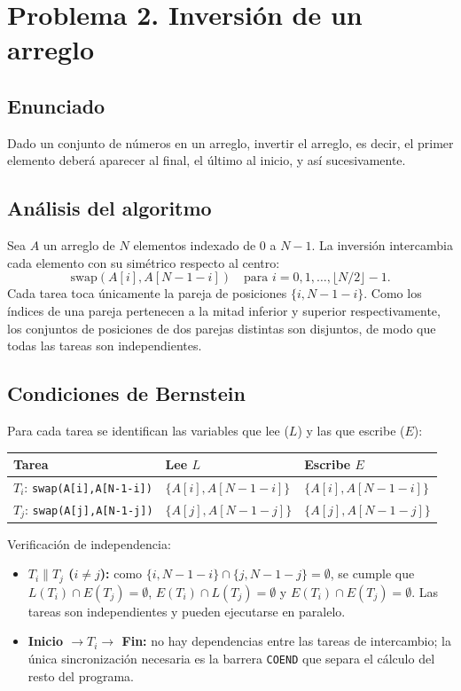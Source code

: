 \section{Problema 2. Inversi\'on de un arreglo}

\subsection*{Enunciado}
Dado un conjunto de n\'umeros en un arreglo, invertir el arreglo, es decir, el
primer elemento deber\'a aparecer al final, el \'ultimo al inicio, y as\'i
sucesivamente.

\subsection*{An\'alisis del algoritmo}
Sea $A$ un arreglo de $N$ elementos indexado de $0$ a $N-1$. La inversi\'on
intercambia cada elemento con su sim\'etrico respecto al centro:
\[
    \text{swap}(A[i], A[N-1-i]) \quad \text{para } i = 0, 1, \dots, \lfloor N/2 \rfloor - 1.
\]
Cada tarea toca \'unicamente la pareja de posiciones $\{i, N-1-i\}$. Como los
\'indices de una pareja pertenecen a la mitad inferior y superior
respectivamente, los conjuntos de posiciones de dos parejas distintas son
disjuntos, de modo que todas las tareas son independientes.

\subsection*{Condiciones de Bernstein}
Para cada tarea se identifican las variables que lee ($L$) y las que escribe
($E$):

\begin{center}
\begin{tabular}{lll}
\toprule
Tarea & Lee $L$ & Escribe $E$ \\
\midrule
$T_i$: \texttt{swap(A[i],A[N-1-i])} & $\{A[i],A[N-1-i]\}$ & $\{A[i],A[N-1-i]\}$ \\
$T_j$: \texttt{swap(A[j],A[N-1-j])} & $\{A[j],A[N-1-j]\}$ & $\{A[j],A[N-1-j]\}$ \\
\bottomrule
\end{tabular}
\end{center}

Verificaci\'on de independencia:
\begin{itemize}[leftmargin=1.4cm]
    \item \textbf{$T_i \parallel T_j$ ($i \neq j$):} como
    $\{i, N-1-i\} \cap \{j, N-1-j\} = \emptyset$, se cumple que
    $L(T_i) \cap E(T_j) = \emptyset$, $E(T_i) \cap L(T_j) = \emptyset$ y
    $E(T_i) \cap E(T_j) = \emptyset$. Las tareas son independientes y pueden
    ejecutarse en paralelo.
    \item \textbf{Inicio $\rightarrow T_i \rightarrow$ Fin:} no hay
    dependencias entre las tareas de intercambio; la \'unica sincronizaci\'on
    necesaria es la barrera \texttt{COEND} que separa el c\'alculo del resto del
    programa.
\end{itemize}

